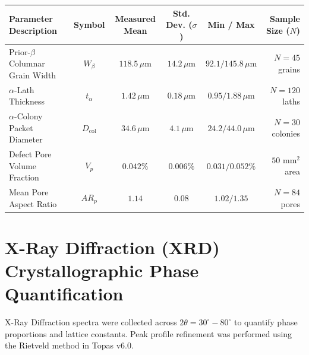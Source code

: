 \documentclass[10pt,a4paper,parskip=half]{scrartcl}
\begin{document}
\vspace{1mm}
\noindent
{}
\vspace{-1mm}
{\small
\begin{tabularx}{\textwidth}{@{}YccccR@{}}
\toprule
{}
\textbf{Parameter Description} & \textbf{Symbol} & \textbf{Measured Mean} & \textbf{Std. Dev. ($\sigma$)} & \textbf{Min / Max} & \textbf{Sample Size ($N$)} \\
\midrule
Prior-$\beta$ Columnar Grain Width & $W_{\beta}$ & $118.5\,\mu\text{m}$ & $14.2\,\mu\text{m}$ & $92.1 / 145.8\,\mu\text{m}$ & $N = 45$ grains \\
$\alpha$-Lath Thickness & $t_{\alpha}$ & $1.42\,\mu\text{m}$ & $0.18\,\mu\text{m}$ & $0.95 / 1.88\,\mu\text{m}$ & $N = 120$ laths \\
$\alpha$-Colony Packet Diameter & $D_{\text{col}}$ & $34.6\,\mu\text{m}$ & $4.1\,\mu\text{m}$ & $24.2 / 44.0\,\mu\text{m}$ & $N = 30$ colonies \\
Defect Pore Volume Fraction & $V_p$ & $0.042\%$ & $0.006\%$ & $0.031 / 0.052\%$ & $50\text{ mm}^2$ area \\
Mean Pore Aspect Ratio & $AR_p$ & $1.14$ & $0.08$ & $1.02 / 1.35$ & $N = 84$ pores \\
\bottomrule
\end{tabularx}
}

\vspace{2mm}

\section{X-Ray Diffraction (XRD) Crystallographic Phase Quantification}

X-Ray Diffraction spectra were collected across $2\theta = 30^\circ - 80^\circ$ to quantify phase proportions and lattice constants. Peak profile refinement was performed using the Rietveld method in Topas v6.0.
\end{document}
